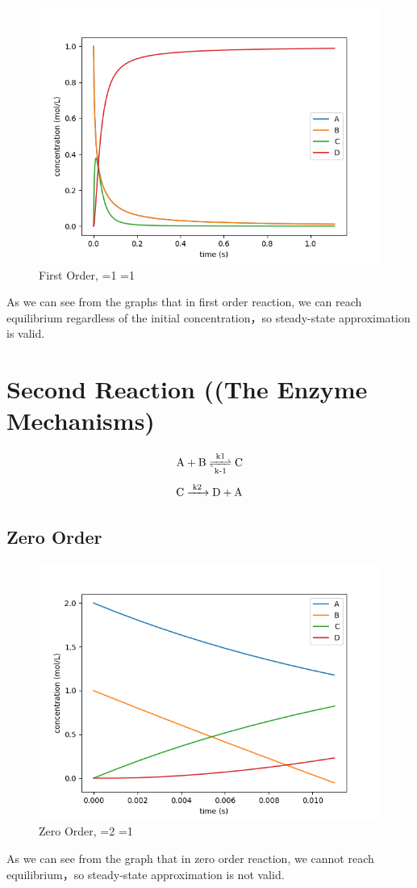 \documentclass{article}
\begin{document}
\begin{figure}[H]
\centering
\includegraphics[scale=0.6]{1. first 1 1.png}
\caption{First Order, =1 =1}
\end{figure}
As we can see from the graphs that in first order reaction, we can reach equilibrium regardless of the initial concentration，so steady-state approximation is valid.


\section{Second Reaction ((The Enzyme Mechanisms)}
\begin{equation}
    \ce{A + B <=>T[k1][k-1] C}
\end{equation}
\begin{equation}
    \ce{C ->T[k2] D + A}
\end{equation}
\subsection{Zero Order}
\begin{figure}[H]
\centering
\includegraphics[scale=0.6]{2. zero.png}
\caption{Zero Order, =2 =1}
\end{figure}
As we can see from the graph that in zero order reaction, we cannot reach equilibrium，so steady-state approximation is not valid.
\end{document}

